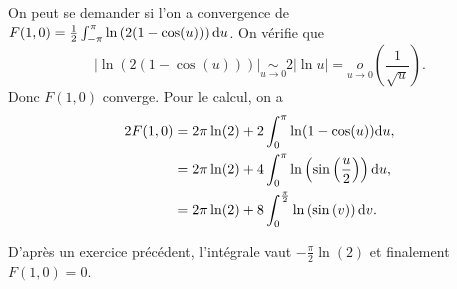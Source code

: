 \documentclass[12pt]{article}
\begin{document}
\begin{remark}
    On peut se demander si l'on a convergence de $F(1,0)=\frac{1}{2}\int_{-\pi}^{\pi}\ln\left(2(1-\cos(u))\right)\mathrm{d} u$. On vérifie que 
    \begin{equation}
        \left\lvert\ln(2(1-\cos(u)))\right\vert\underset{u\to0}{\sim}2\left\lvert\ln u\right\rvert=\underset{u\to0}{o}\left(\frac{1}{\sqrt{u}}\right).
    \end{equation}
    Donc $F(1,0)$ converge. Pour le calcul, on a 
    \begin{align}
        2F(1,0)
        &=2\pi\ln(2)+2\int_{0}^{\pi}\ln(1-\cos(u))\mathrm{d} u,\\
        &=2\pi\ln(2)+4\int_{0}^{\pi}\ln\left(\sin\left(\frac{u}{2}\right)\right)\mathrm{d} u,\\
        &=2\pi\ln(2)+8\int_{0}^{\frac{\pi}{2}}\ln\left(\sin\left(v\right)\right)\mathrm{d} v.
    \end{align}

    D'après un exercice précédent, l'intégrale vaut $-\frac{\pi}{2}\ln(2)$ et finalement $F(1,0)=0$.
\end{remark}
\end{document}
